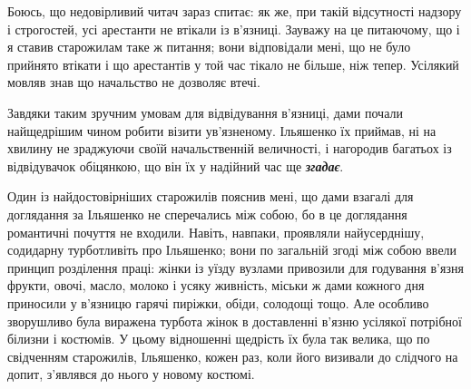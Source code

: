 \documentclass[a4paper,20pt]{report}
\begin{document}
Боюсь, що недовірливий читач зараз спитає: як же, при такій відсутності надзору
і строгостей, усі арестанти не втікали із в'язниці. Зауважу на це питаючому, що
і я ставив старожилам таке ж питання; вони відповідали мені, що не було
прийнято втікати і що арестантів у той час тікало не більше, ніж тепер.
Усілякий мовляв знав що начальство не дозволяє втечі.

Завдяки таким зручним умовам для відвідування в'язниці, дами почали
найщедрішим чином робити візити ув'язненому. Ільяшенко їх приймав, ні на хвилину не
зраджуючи своїй начальственній величності, і нагородив багатьох із відвідувачок
обіцянкою, що він їх у надійний час ще \textbf{\emph{згадає}}.

Один із найдостовірніших старожилів пояснив мені, що дами взагалі для
доглядання за Ільяшенко не сперечались між собою, бо в це доглядання романтичні
почуття не входили. Навіть, навпаки, проявляли найусерднішу, содидарну
турботливіть про Ільяшенко; вони по загальній згоді між собою ввели принцип
розділення праці: жінки із уїзду вузлами привозили для годування в'язня фрукти,
овочі, масло, молоко і усяку живність, міськи ж дами кожного дня приносили у в'язницю
гарячі пиріжки, обіди, солодощі тощо. Але особливо зворушливо була виражена
турбота жінок в доставленні в'язню усілякої потрібної білизни і костюмів. У цьому
відношенні щедрість їх була так велика, що по свідченням старожилів, Ільяшенко, кожен раз,
коли його визивали до слідчого на допит, з'являвся до нього у новому костюмі.

\end{document}
